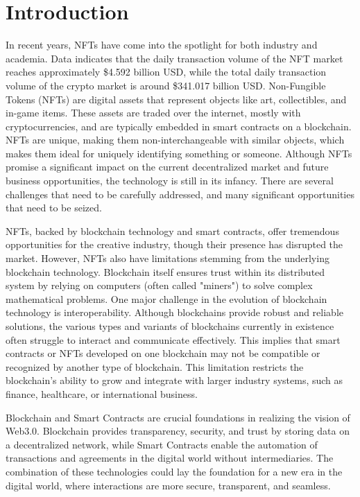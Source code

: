 \section{Introduction}
\label{sec:pendahuluan}


In recent years, NFTs have come into the spotlight for both industry and academia. Data indicates that the daily transaction volume of the NFT market reaches approximately \$4.592 billion USD, while the total daily transaction volume of the crypto market is around \$341.017 billion USD. Non-Fungible Tokens (NFTs) are digital assets that represent objects like art, collectibles, and in-game items. These assets are traded over the internet, mostly with cryptocurrencies, and are typically embedded in smart contracts on a blockchain. NFTs are unique, making them non-interchangeable with similar objects, which makes them ideal for uniquely identifying something or someone. Although NFTs promise a significant impact on the current decentralized market and future business opportunities, the technology is still in its infancy. There are several challenges that need to be carefully addressed, and many significant opportunities that need to be seized.

NFTs, backed by blockchain technology and smart contracts, offer tremendous opportunities for the creative industry, though their presence has disrupted the market. However, NFTs also have limitations stemming from the underlying blockchain technology. Blockchain itself ensures trust within its distributed system by relying on computers (often called "miners") to solve complex mathematical problems. One major challenge in the evolution of blockchain technology is interoperability. Although blockchains provide robust and reliable solutions, the various types and variants of blockchains currently in existence often struggle to interact and communicate effectively. This implies that smart contracts or NFTs developed on one blockchain may not be compatible or recognized by another type of blockchain. This limitation restricts the blockchain's ability to grow and integrate with larger industry systems, such as finance, healthcare, or international business.

Blockchain and Smart Contracts are crucial foundations in realizing the vision of Web3.0. Blockchain provides transparency, security, and trust by storing data on a decentralized network, while Smart Contracts enable the automation of transactions and agreements in the digital world without intermediaries. The combination of these technologies could lay the foundation for a new era in the digital world, where interactions are more secure, transparent, and seamless.

